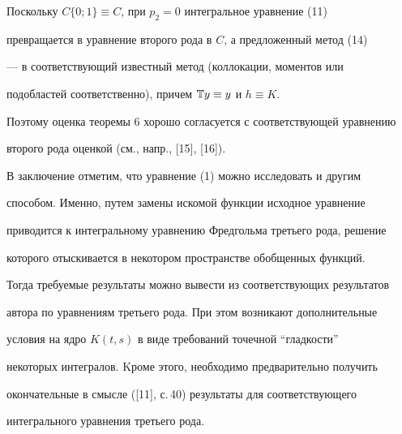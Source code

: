 \begin{note} 


Поскольку $C\{0;1\}\equiv C$, при $p_2=0$ интегральное уравнение (11) 


превращается в уравнение второго рода в $C$, а предложенный метод (14) 


--- в соответствующий известный метод (коллокации, моментов или 


подобластей соответственно), причем $\Bbb T y\equiv y$ и $h\equiv K$. 


Поэтому оценка теоремы 6 хорошо согласуется с соответствующей уравнению 


второго рода оценкой (см., напр., [15], [16]). 


\end{note} 


 


\begin{note} 


В заключение отметим, что уравнение (1) можно исследовать и другим 


способом. Именно, путем замены искомой функции исходное уравнение 


приводится к интегральному уравнению Фредгольма третьего рода, решение 


которого отыскивается в некотором пространстве обобщенных функций. 


Тогда требуемые результаты можно вывести из соответствующих результатов 


автора по уравнениям третьего рода. При этом возникают дополнительные 


условия на ядро $K(t,s)$ в виде требований точечной ``гладкости'' 


некоторых интегралов. Kроме этого, необходимо предварительно получить 


окончательные в смысле ([11], с.\,40) результаты для соответствующего 


интегрального уравнения третьего рода. 


\end{note} 


 


